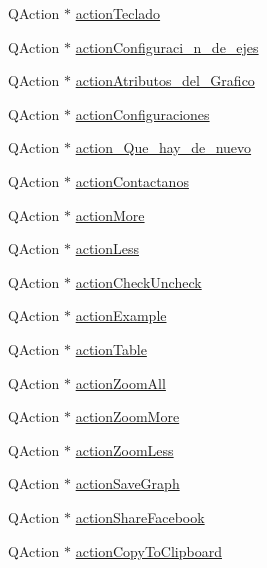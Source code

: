 \begin{DoxyCompactItemize}
\item 
Q\+Action $\ast$ \hyperlink{class_ui___main_window_a123e09a5ba13221377a479d15a1a1e80}{action\+Teclado}
\item 
Q\+Action $\ast$ \hyperlink{class_ui___main_window_a5ff8bf08d3f42741082f7fc38269b300}{action\+Configuraci\+\_\+n\+\_\+de\+\_\+ejes}
\item 
Q\+Action $\ast$ \hyperlink{class_ui___main_window_a46a973ddf470ce8d2a7ccf1a83490ea4}{action\+Atributos\+\_\+del\+\_\+\+Grafico}
\item 
Q\+Action $\ast$ \hyperlink{class_ui___main_window_a326a597fc3e106d2131932e74faf684e}{action\+Configuraciones}
\item 
Q\+Action $\ast$ \hyperlink{class_ui___main_window_ae232a0f9612ec1aa28f1ade5e93a0a42}{action\+\_\+\+Que\+\_\+hay\+\_\+de\+\_\+nuevo}
\item 
Q\+Action $\ast$ \hyperlink{class_ui___main_window_a6b51e3a903b45f4f2ccc6e976a3b725e}{action\+Contactanos}
\item 
Q\+Action $\ast$ \hyperlink{class_ui___main_window_a8918bcd55de6f08cb49f1958a9cc0017}{action\+More}
\item 
Q\+Action $\ast$ \hyperlink{class_ui___main_window_a0818795f78e33bc8895f0f2d0acc42b5}{action\+Less}
\item 
Q\+Action $\ast$ \hyperlink{class_ui___main_window_ad5baa5b64ba995e1406c6c3b68373aae}{action\+Check\+Uncheck}
\item 
Q\+Action $\ast$ \hyperlink{class_ui___main_window_a8d48ae207a55343c5a23204a5e9d20cf}{action\+Example}
\item 
Q\+Action $\ast$ \hyperlink{class_ui___main_window_a8b335389f4537275f228a97a4d08d326}{action\+Table}
\item 
Q\+Action $\ast$ \hyperlink{class_ui___main_window_a4e4723a0231eec3c02b71f5616209f84}{action\+Zoom\+All}
\item 
Q\+Action $\ast$ \hyperlink{class_ui___main_window_a6dbbb34c7b1c9876b68a56c121b2d59d}{action\+Zoom\+More}
\item 
Q\+Action $\ast$ \hyperlink{class_ui___main_window_ab6dcb6ed45626cbf56afb91826067fe7}{action\+Zoom\+Less}
\item 
Q\+Action $\ast$ \hyperlink{class_ui___main_window_a3ad4a9428070ed55580696e0f9b64147}{action\+Save\+Graph}
\item 
Q\+Action $\ast$ \hyperlink{class_ui___main_window_a3c668b98bc893e81c6c8a56176eeccb4}{action\+Share\+Facebook}
\item 
Q\+Action $\ast$ \hyperlink{class_ui___main_window_a0350e8bf05e4dbbc399cc4945d95dc64}{action\+Copy\+To\+Clipboard}

\end{DoxyCompactItemize}
